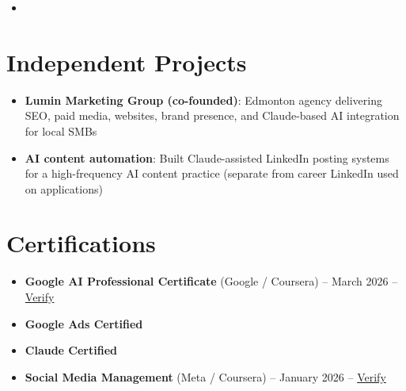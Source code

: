 \documentclass[11pt,a4paper,sans]{moderncv}
\begin{document}
\begin{itemize}
\vspace{3pt}

\item{}

\end{itemize}

\section{Independent Projects}
\vspace{1pt}
\begin{itemize}
\item \textbf{Lumin Marketing Group (co-founded)}: Edmonton agency delivering SEO, paid media, websites, brand presence, and Claude-based AI integration for local SMBs
\item \textbf{AI content automation}: Built Claude-assisted LinkedIn posting systems for a high-frequency AI content practice (separate from career LinkedIn used on applications)
\end{itemize}

\section{Certifications}
\vspace{1pt}
\begin{itemize}
\item \textbf{Google AI Professional Certificate} (Google / Coursera) -- March 2026 -- \href{https://www.coursera.org/account/accomplishments/verify/professional-cert/54E1P3RBHVL8}{Verify}
\item \textbf{Google Ads Certified}
\item \textbf{Claude Certified}
\item \textbf{Social Media Management} (Meta / Coursera) -- January 2026 -- \href{https://www.coursera.org/account/accomplishments/verify/7NOVGMU2L69G}{Verify}
\end{itemize}
\end{document}
